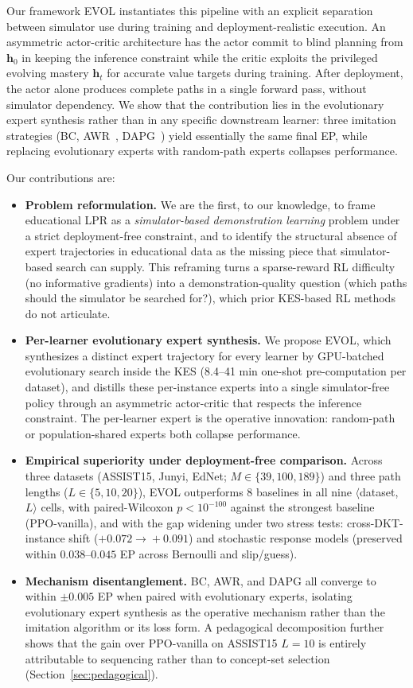 \documentclass[sigconf,anonymous]{acmart}
\newcommand{\ours}{\textrm{EVOL}}
\begin{document}
Our framework \ours{} instantiates this pipeline with an explicit separation between simulator use during training and deployment-realistic execution. An asymmetric actor-critic architecture has the actor commit to blind planning from $\mathbf{h}_0$ in keeping the inference constraint while the critic exploits the privileged evolving mastery $\mathbf{h}_t$ for accurate value targets during training. After deployment, the actor alone produces complete paths in a single forward pass, without simulator dependency. We show that the contribution lies in the evolutionary expert synthesis rather than in any specific downstream learner: three imitation strategies (BC, AWR~\cite{peng2019awr}, DAPG~\cite{rajeswaran2018dexterous}) yield essentially the same final EP, while replacing evolutionary experts with random-path experts collapses performance.

Our contributions are:
\begin{itemize}
    \item \textbf{Problem reformulation.} We are the first, to our knowledge, to frame educational LPR as a \emph{simulator-based demonstration learning} problem under a strict deployment-free constraint, and to identify the structural absence of expert trajectories in educational data as the missing piece that simulator-based search can supply. This reframing turns a sparse-reward RL difficulty (no informative gradients) into a demonstration-quality question (which paths should the simulator be searched for?), which prior KES-based RL methods do not articulate.
    \item \textbf{Per-learner evolutionary expert synthesis.} We propose \ours{}, which synthesizes a distinct expert trajectory for every learner by GPU-batched evolutionary search inside the KES (8.4--41 min one-shot pre-computation per dataset), and distills these per-instance experts into a single simulator-free policy through an asymmetric actor-critic that respects the inference constraint. The per-learner expert is the operative innovation: random-path or population-shared experts both collapse performance.
    \item \textbf{Empirical superiority under deployment-free comparison.} Across three datasets (ASSIST15, Junyi, EdNet; $M\in\{39,100,189\}$) and three path lengths ($L\in\{5,10,20\}$), \ours{} outperforms 8 baselines in all nine $\langle$dataset, $L\rangle$ cells, with paired-Wilcoxon $p\!<\!10^{-100}$ against the strongest baseline (PPO-vanilla), and with the gap widening under two stress tests: cross-DKT-instance shift ($+0.072\!\to\!+0.091$) and stochastic response models (preserved within $0.038$--$0.045$ EP across Bernoulli and slip/guess).
    \item \textbf{Mechanism disentanglement.} BC, AWR, and DAPG all converge to within $\pm 0.005$ EP when paired with evolutionary experts, isolating evolutionary expert synthesis as the operative mechanism rather than the imitation algorithm or its loss form. A pedagogical decomposition further shows that the gain over PPO-vanilla on ASSIST15 $L\!=\!10$ is entirely attributable to sequencing rather than to concept-set selection (Section~\ref{sec:pedagogical}).
\end{itemize}
\end{document}
